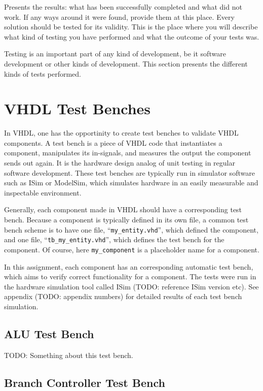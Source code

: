 Presents the results: what has been successfully completed and what did not work.
If any ways around it were found, provide them at this place.
Every solution should be tested for its validity.
This is the place where you will describe what kind of testing you have performed and what the outcome of your tests was.

Testing is an important part of any kind of development, be it software development or other kinds of development.
This section presents the different kinds of tests performed.

\section{VHDL Test Benches}

In VHDL, one has the opportinity to create test benches to validate VHDL components.
A test bench is a piece of VHDL code that instantiates a component, manipulates its in-signals, and measures the output the component sends out again.
It is the hardware design analog of unit testing in regular software development.
These test benches are typically run in simulator software such as ISim or ModelSim, which simulates hardware in an easily measurable and inspectable environment.

Generally, each component made in VHDL should have a corresponding test bench.
Because a component is typically defined in its own file, a common test bench scheme is to have one file, ``\texttt{my\_entity.vhd}'', which defined the component, and one file, ``\texttt{tb\_my\_entity.vhd}'', which defines the test bench for the component.
Of course, here \texttt{my\_component} is a placeholder name for a component.

In this assignment, each component has an corresponding automatic test bench, which aims to verify correct functionality for a component.
The tests were run in the hardware simulation tool called ISim (TODO: reference ISim version etc).
See appendix (TODO: appendix numbers) for detailed results of each test bench simulation.

\subsection{ALU Test Bench}

TODO: Something about this test bench.

\subsection{Branch Controller Test Bench}


